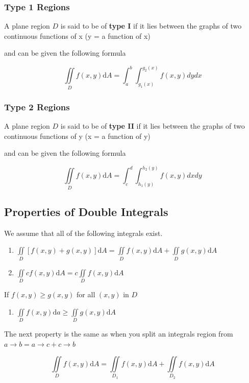 \documentclass{article}
\begin{document}
\subsubsection*{Type 1 Regions}

A plane region $D$ is said to be of \textbf{type I} if it lies between the graphs of two continuous functions of x (y = a function of x)

and can be given the following formula

$$\iint\limits_{D}f(x,y)\mathrm{d}A = \int^b_a\int^{g_2(x)}_{g_1(x)} f(x,y) dy dx$$

\subsubsection*{Type 2 Regions}

A plane region $D$ is said to be of \textbf{type II} if it lies between the graphs of two continuous functions of y (x = a function of y)

and can be given the following formula

$$\iint\limits_{D}f(x,y)\mathrm{d}A = \int^d_c\int^{h_2(y)}_{h_1(y)} f(x,y) dx dy$$

\subsection{Properties of Double Integrals}

We assume that all of the following integrals exist.

\begin{enumerate}
    \item $\iint\limits_{D}[f(x,y) + g(x,y)]\mathrm{d}A = \iint\limits_{D}f(x,y)\mathrm{d}A + \iint\limits_{D}g(x,y)\mathrm{d}A$
    \item $\iint\limits_{D}cf(x,y)\mathrm{d}A = c \iint\limits_{D}f(x,y)\mathrm{d}A$
\end{enumerate}

If $f(x,y) \geq g(x,y)$ for all $(x,y)$ in $D$

\begin{enumerate}
    \item $\iint\limits_{D} f(x,y) \mathrm{d}a \geq \iint\limits_{D}g(x,y) \mathrm{d}A$
\end{enumerate}

The next property is the same as when you split an integrals region from $a \rightarrow b  = a \rightarrow c + c \rightarrow b$

$$\iint\limits_{D}f(x,y)\mathrm{d}A = \iint\limits_{D_1}f(x,y)\mathrm{d}A + \iint\limits_{D_2}f(x,y)\mathrm{d}A$$
\end{document}

